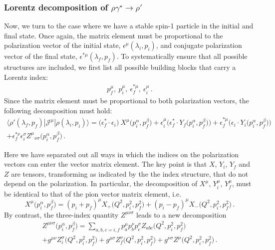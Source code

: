 {\subsubsection{Lorentz decomposition of $\rho\gamma^\star\to\rho'$}

Now, we turn to the case where we have a stable spin-1 particle in the initial and final state. Once again, the matrix element must be proportional to the polarization vector of the initial state, $\epsilon^{\mu}(\lambda_i, p_i)$, and conjugate polarization vector of the final state, $\epsilon^{* \mu}(\lambda_f,p_f)$.  To systematically ensure that all possible structures are included, we first list all possible building blocks that carry a Lorentz index:
\begin{gather}
p_f^\mu,\ p_i^\mu,\ \epsilon^{*\mu}_f,\ \epsilon_i^{\mu} \,.
\end{gather}
Since the matrix element must be proportional to both polarization vectors, the following decomposition must hold:
\begin{multline}
\langle\rho'(\lambda_f,p_f)|{\mathcal{J}}^{\mu}|\rho(\lambda_i,p_i)\rangle
=
\big ( \epsilon_f^*\cdot \epsilon_i \big ) \  {X}^\mu \big (p_i^\alpha,p_f^\beta \big)
+ \epsilon_i^\mu    \Big ( \epsilon_f^* \cdot {Y_f} \big (p_i^\alpha,p_f^\beta \big) \Big ) 
+ \epsilon_f^{*\mu}  \Big (  \epsilon_i \cdot {Y_i}  \big (p_i^\alpha,p_f^\beta \big)  \Big ) \\ 
+  \epsilon_f^{*\nu}   \epsilon_i^\sigma {Z^{\mu}}_{\nu \sigma}  \big (p_i^\alpha,p_f^\beta \big) \,.
\end{multline}
 
 Here we have separated out all ways in which the indices on the polarization vectors can enter the vector matrix element. The key point is that $X$, $Y_i$, $Y_f$ and $Z$ are tensors, transforming as indicated by the the index structure, that do not depend on the polarization. In particular, the decomposition of $X^\mu$, $Y_i^\mu$, $Y_f^\mu$, must be identical to that of the pion vector matrix element, i.e.
\begin{equation}
{X}^\mu \big (p_i^\alpha,p_f^\beta \big) = (p_i + p_f)^\mu X_+ \big (Q^2, p_i^2,p_f^2 \big) + (p_i - p_f)^\mu {X_-} \big (Q^2, p_i^2,p_f^2 \big) \,.
\end{equation}
By contrast, the three-index quantity $Z^{\mu \nu \sigma}$ leads to a new decomposition
\begin{multline}
Z^{\mu \nu \sigma} \big (p_i^\alpha,p_f^\beta \big) = \sum_{a,b,c=i,f} p_a^\mu p_b^\nu p_c^\sigma Z_{abc} \big (Q^2, p_i^2,p_f^2 \big) \\ 
+ g^{\mu \nu}  Z^\sigma_i \big (Q^2, p_i^2,p_f^2 \big) + g^{\mu \sigma}  Z^\nu_f \big (Q^2, p_i^2,p_f^2 \big) + g^{\nu \sigma}  Z^\mu \big (Q^2, p_i^2,p_f^2 \big) \,.
\end{multline}
{} 

}

